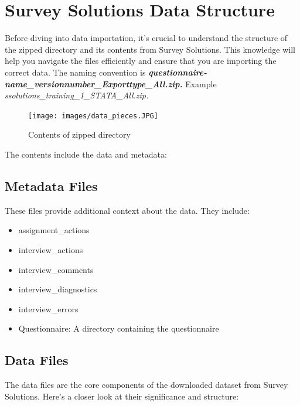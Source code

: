 \documentclass[
  letterpaper,
  DIV=11,
  numbers=noendperiod]{scrreprt}
\begin{document}
\section{Survey Solutions Data
Structure}\label{survey-solutions-data-structure}

Before diving into data importation, it's crucial to understand the
structure of the zipped directory and its contents from Survey
Solutions. This knowledge will help you navigate the files efficiently
and ensure that you are importing the correct data. The naming
convention is
\textbf{\emph{questionnaire-name\_versionnumber\_Exporttype\_All.zip.}}
Example \emph{ssolutions\_training\_1\_STATA\_All.zip.}

\begin{figure}[H]

{\centering \texttt{[image: images/data\_pieces.JPG]}

}

\caption{Contents of zipped directory}

\end{figure}%

The contents include the data and metadata:

\subsection{Metadata Files}\label{metadata-files}

These files provide additional context about the data. They include:

\begin{itemize}
\item
  assignment\_actions
\item
  interview\_actions
\item
  interview\_comments
\item
  interview\_diagnostics
\item
  interview\_errors
\item
  Questionnaire: A directory containing the questionnaire
\end{itemize}

\subsection{Data Files}\label{data-files}

The data files are the core components of the downloaded dataset from
Survey Solutions. Here's a closer look at their significance and
structure:
\end{document}
